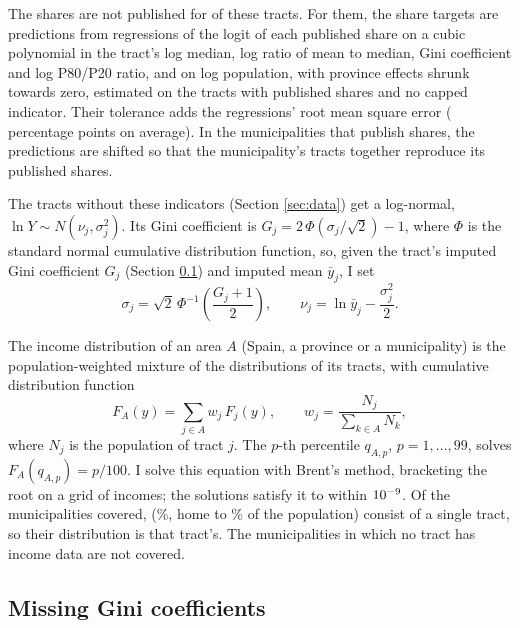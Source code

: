 The shares are not published for \GbPriorTracts{} of these tracts. For them, the share targets are predictions from regressions of the logit of each published share on a cubic polynomial in the tract's log median, log ratio of mean to median, Gini coefficient and log P80/P20 ratio, and on log population, with province effects shrunk towards zero, estimated on the \GbPriorTrain{} tracts with published shares and no capped indicator. Their tolerance adds the regressions' root mean square error (\GbPriorRMSE{} percentage points on average). In the \GbGapMuns{} municipalities that publish shares, the predictions are shifted so that the municipality's tracts together reproduce its published shares.

The \LocMeanTracts{} tracts without these indicators (Section \ref{sec:data}) get a log-normal, $\ln Y \sim N(\nu_j, \sigma_j^2)$. Its Gini coefficient is $G_j = 2\,\Phi(\sigma_j/\sqrt{2}) - 1$, where $\Phi$ is the standard normal cumulative distribution function, so, given the tract's imputed Gini coefficient $G_j$ (Section \ref{sec:gini}) and imputed mean $\bar y_j$, I set
\begin{equation}\label{eq:params}
\sigma_j = \sqrt{2}\,\Phi^{-1}\!\left(\frac{G_j + 1}{2}\right), \qquad \nu_j = \ln \bar y_j - \frac{\sigma_j^2}{2}.
\end{equation}

The income distribution of an area $A$ (Spain, a province or a municipality) is the population-weighted mixture of the distributions of its tracts, with cumulative distribution function
\begin{equation}\label{eq:mixture}
F_A(y) = \sum_{j \in A} w_j\, F_j(y), \qquad w_j = \frac{N_j}{\sum_{k \in A} N_k},
\end{equation}
where $N_j$ is the population of tract $j$. The $p$-th percentile $q_{A,p}$, $p = 1, \dots, 99$, solves $F_A(q_{A,p}) = p/100$. I solve this equation with Brent's method, bracketing the root on a grid of incomes; the solutions satisfy it to within $10^{-9}$. Of the \MunLookup{} municipalities covered, \MunSingleTract{} (\MunSingleTractPct{}\%, home to \MunSingleTractPopPct{}\% of the population) consist of a single tract, so their distribution is that tract's. The \MunDropped{} municipalities in which no tract has income data are not covered.

\subsection{Missing Gini coefficients}\label{sec:gini}

